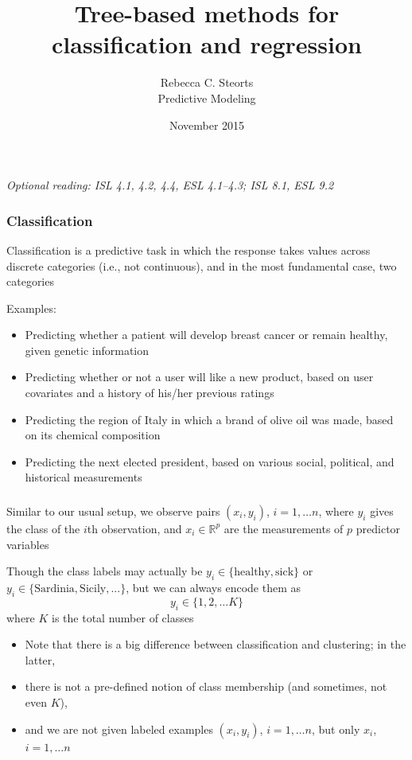 \documentclass[mathserif]{beamer}
\def\R{\mathds{R}}
\def\red{\color[rgb]{0.8,0,0}}
\begin{document}
\title{Tree-based methods for classification and regression}
\author{Rebecca C. Steorts \\ Predictive Modeling}
\date{November 2015}

\begin{frame}
\maketitle
{\it Optional reading: ISL 4.1, 4.2, 4.4, ESL 4.1--4.3; ISL 8.1, ESL 9.2}
\end{frame} 

\begin{frame}
\frametitle{Classification}
{\red Classification} is a predictive task in which the response takes
values across discrete categories (i.e., not continuous), and in the 
most fundamental case, two categories

\bigskip
Examples:
\begin{itemize}
\item Predicting whether a patient will develop breast cancer or remain
healthy, given genetic information
\item Predicting whether or not a user will like a new product, based on
user covariates and a history of his/her previous ratings
\item Predicting the region of Italy in which a brand of olive oil was 
made, based on its chemical composition
\item Predicting the next elected president, based on various social,
political, and historical measurements
\end{itemize}
\end{frame}

\begin{frame}
\frametitle{}
Similar to our usual setup, we observe pairs $(x_i,y_i)$, $i=1,\ldots n$, 
where $y_i$ gives the class of the $i$th observation, and $x_i \in \R^p$ are
the measurements of $p$ predictor variables

\bigskip
Though the class labels may actually be $y_i \in \{\mathrm{healthy}, 
\mathrm{sick}\}$ or $y_i \in \{\mathrm{Sardinia}, \mathrm{Sicily}, ... \}$, 
but we can always encode them as 
$$y_i \in \{1,2,\ldots K\}$$
where $K$ is the total number of classes

\bigskip
\begin{itemize}
\item Note that there is a {\red big difference} between classification and
clustering; in the latter, 
\item there is not a pre-defined notion of class 
membership (and sometimes, not even $K$), 
\item and we are not given labeled 
examples $(x_i,y_i)$, $i=1,\ldots n$, but only $x_i$, $i=1,\ldots n$
\end{itemize}
\end{frame}
\end{document}
